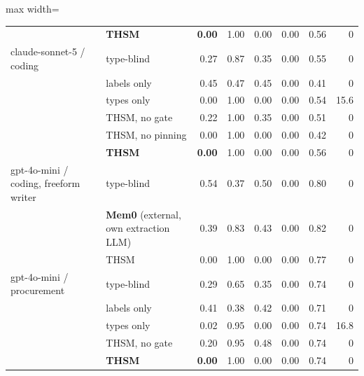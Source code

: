 \begin{table}[!ht]
\begin{adjustbox}{max width=\linewidth}
\begin{tabular}{llrrrrrr}
 & \textbf{THSM} & \textbf{0.00} & 1.00 & 0.00 & 0.00 & 0.56 & 0 \\
claude-sonnet-5 / coding & type-blind & 0.27 & 0.87 & 0.35 & 0.00 & 0.55 & 0 \\
 & labels only & 0.45 & 0.47 & 0.45 & 0.00 & 0.41 & 0 \\
 & types only & 0.00 & 1.00 & 0.00 & 0.00 & 0.54 & 15.6 \\
 & THSM, no gate & 0.22 & 1.00 & 0.35 & 0.00 & 0.51 & 0 \\
 & THSM, no pinning & 0.00 & 1.00 & 0.00 & 0.00 & 0.42 & 0 \\
 & \textbf{THSM} & \textbf{0.00} & 1.00 & 0.00 & 0.00 & 0.56 & 0 \\
gpt-4o-mini / coding, freeform writer & type-blind & 0.54 & 0.37 & 0.50 & 0.00 & 0.80 & 0 \\
 & \textbf{Mem0} (external, own extraction LLM) & 0.39 & 0.83 & 0.43 & 0.00 & 0.82 & 0 \\
 & THSM & 0.00 & 1.00 & 0.00 & 0.00 & 0.77 & 0 \\
gpt-4o-mini / procurement & type-blind & 0.29 & 0.65 & 0.35 & 0.00 & 0.74 & 0 \\
 & labels only & 0.41 & 0.38 & 0.42 & 0.00 & 0.71 & 0 \\
 & types only & 0.02 & 0.95 & 0.00 & 0.00 & 0.74 & 16.8 \\
 & THSM, no gate & 0.20 & 0.95 & 0.48 & 0.00 & 0.74 & 0 \\
 & \textbf{THSM} & \textbf{0.00} & 1.00 & 0.00 & 0.00 & 0.74 & 0 \\
\bottomrule
\end{tabular}
\end{adjustbox}
\end{table}
